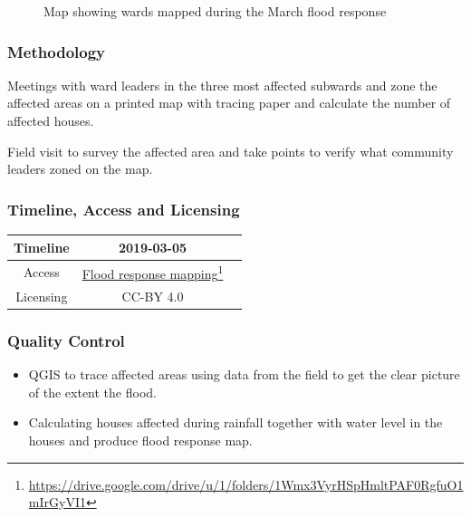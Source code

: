 \documentclass[a4paper,12pt,twoside]{article}
\begin{document}
\begin{figure}[h]
  \color{RHgreen}\caption{Map showing wards mapped during the March flood response}
  \centering
\end{figure}

\subsubsection{Methodology}
Meetings with ward leaders in the three most affected subwards and zone the affected areas on a printed map with tracing paper and calculate the number of affected houses.

Field visit to survey the affected area and take points to verify what community leaders zoned on the map.

\medskip
\subsubsection{Timeline, Access and Licensing}
\begin{center}
\begin{tabular}{|c|c|c|}  
 \hline
  Timeline  &  2019-03-05 \\
\hline  
 Access  & 
   \href{https://drive.google.com/drive/u/1/folders/1Wmx3VyrHSpHmltPAF0RgfuO1mIrGyVI1}{Flood response mapping}\footnote{\url{https://drive.google.com/drive/u/1/folders/1Wmx3VyrHSpHmltPAF0RgfuO1mIrGyVI1}} \\
  
\hline
Licensing   &  CC-BY 4.0 \\
\hline

\end{tabular}
\end{center}

\subsubsection{Quality Control}
\begin{itemize}
    \item QGIS to trace affected areas using data from the field to get the clear picture of the extent the flood. 
   \item Calculating houses affected during rainfall together with  water level in the houses  and produce flood response map.
\end{itemize}
\end{document}
